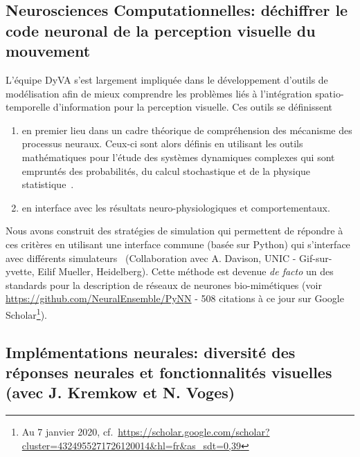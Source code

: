 \documentclass[11pt,french,a4paper,oneside]{article}%
\begin{document}
\subsection{Neurosciences Computationnelles: déchiffrer le code neuronal de la perception visuelle du mouvement}

L'équipe DyVA s'est largement impliquée dans le développement d'outils de modélisation afin de mieux comprendre les problèmes liés à l'intégration spatio-temporelle d'information pour la perception visuelle. Ces outils se définissent
\begin{enumerate}
\item en premier lieu dans un cadre théorique de compréhension des mécanisme des processus neuraux. Ceux-ci sont alors définis en utilisant les outils mathématiques pour l'étude des systèmes dynamiques complexes qui sont empruntés des probabilités, du calcul stochastique et de la physique statistique~\citep{Dauce10}.
\item en interface avec les résultats neuro-physiologiques et comportementaux.
\end{enumerate}
Nous avons construit des stratégies de simulation qui permettent de répondre à ces critères en utilisant une interface commune (basée sur Python) qui s'interface avec différents simulateurs~\citep{Davison07cns,Davison08} (Collaboration avec A. Davison, UNIC - Gif-sur-yvette, Eilif Mueller, Heidelberg). Cette méthode est devenue \emph{de facto} un des standards pour la description de réseaux de neurones bio-mimétiques (voir \url{https://github.com/NeuralEnsemble/PyNN} - 508 citations à ce jour sur Google Scholar\footnote{Au 7 janvier 2020, cf.~\url{https://scholar.google.com/scholar?cluster=4324955271726120014&hl=fr&as_sdt=0,39}}).

\subsection{Implémentations neurales: diversité des réponses neurales et fonctionnalités visuelles (avec J. Kremkow et N. Voges)}
\end{document}

